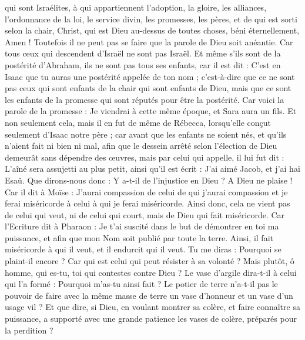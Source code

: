 \begin{multicols}{2}
qui sont Israélites, à qui appartiennent l'adoption, la gloire, les alliances, l'ordonnance de la loi, le service divin,
les promesses, les pères, et de qui est sorti selon la chair, Christ, qui est Dieu au-dessus de toutes choses, béni éternellement, Amen !
Toutefois il ne peut pas se faire que la parole de Dieu soit anéantie. Car tous ceux qui descendent d’Israël ne sont pas Israël.
Et même s'ils sont de la postérité d'Abraham, ils ne sont pas tous ses enfants, car il est dit : C'est en Isaac que tu auras une postérité appelée de ton nom ;
c'est-à-dire que ce ne sont pas ceux qui sont enfants de la chair qui sont enfants de Dieu, mais que ce sont les enfants de la promesse qui sont réputés pour être la postérité.
Car voici la parole de la promesse : Je viendrai à cette même époque, et Sara aura un fils.
Et non seulement cela, mais il en fut de même de Rébecca, lorsqu'elle conçut seulement d'Isaac notre père ;
car avant que les enfants ne soient nés, et qu’ils n'aient fait ni bien ni mal, afin que le dessein arrêté selon l’élection de Dieu demeurât sans dépendre des œuvres, mais par celui qui appelle, 
il lui fut dit : L’aîné sera assujetti au plus petit, ainsi qu’il est écrit :
J'ai aimé Jacob, et j'ai haï Esaü.
Que dirons-nous donc : Y a-t-il de l’injustice en Dieu ? A Dieu ne plaise !
Car il dit à Moïse : J'aurai compassion de celui de qui j’aurai compassion et je ferai miséricorde à celui à qui je ferai miséricorde.
Ainsi donc, cela ne vient pas de celui qui veut, ni de celui qui court, mais de Dieu qui fait miséricorde.
Car l'Ecriture dit à Pharaon : Je t'ai suscité dans le but de démontrer en toi ma puissance, et afin que mon Nom soit publié par toute la terre.
Ainsi, il fait miséricorde à qui il veut, et il endurcit qui il veut.
Tu me diras : Pourquoi se plaint-il encore ? Car qui est celui qui peut résister à sa volonté ?
Mais plutôt, ô homme, qui es-tu, toi qui contestes contre Dieu ? Le vase d’argile dira-t-il à celui qui l'a formé : Pourquoi m'as-tu ainsi fait ?
Le potier de terre n'a-t-il pas le pouvoir de faire avec la même masse de terre un vase d’honneur et un vase d’un usage vil ?
Et que dire, si Dieu, en voulant montrer sa colère, et faire connaître sa puissance, a supporté avec une grande patience les vases de colère, préparés pour la perdition ?

\end{multicols}
